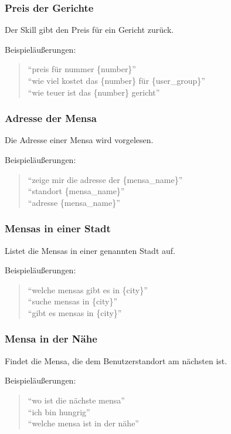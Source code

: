 \documentclass[12pt]{article}
\begin{document}
\subsubsection{Preis der Gerichte}
Der Skill gibt den Preis für ein Gericht zurück.

Beispieläußerungen:
\begin{quote}
“preis für nummer \{number\}”\\
“wie viel kostet das \{number\} für \{user\_group\}”\\
“wie teuer ist das \{number\} gericht”\\
\end{quote}

\subsubsection{Adresse der Mensa}
Die Adresse einer Mensa wird vorgelesen. 

Beispieläußerungen:
\begin{quote}
“zeige mir die adresse der \{mensa\_name\}”\\
“standort \{mensa\_name\}”\\
“adresse \{mensa\_name\}”\\
\end{quote}

\subsubsection{Mensas in einer Stadt}
Listet die Mensas in einer genannten Stadt auf.

Beispieläußerungen:
\begin{quote}
“welche mensas gibt es in \{city\}”\\
“suche mensas in \{city\}”\\
“gibt es mensas in \{city\}”\\
\end{quote}

\subsubsection{Mensa in der Nähe}
Findet die Mensa, die dem Benutzerstandort am nächsten ist.

Beispieläußerungen:
\begin{quote}
“wo ist die nächste mensa”\\
“ich bin hungrig”\\
“welche mensa ist in der nähe”\\
\end{quote}
\end{document}
